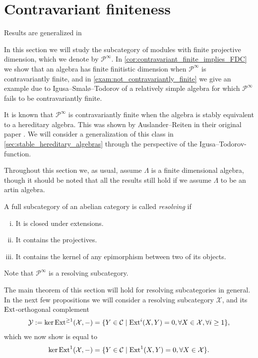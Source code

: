 \section{Contravariant finiteness}

Results are generalized in \cite{Trl01}

In this section we will study the subcategory of modules with finite projective dimension, which we denote by $\mathcal P^\infty$. In \cref{cor:contravariant_finite_implies_FDC} we show that an algebra has finite finitistic dimension when $\mathcal P^\infty$ is contravariantly finite, and in \cref{exam:not_contravariantly_finite} we give an example due to Igusa--Smalø--Todorov of a relatively simple algebra for which $\mathcal P^\infty$ fails to be contravariantly finite.

It is known that $\mathcal P^\infty$ is contravariantly finite when the algebra is stably equivalent to a hereditary algebra. This was shown by Auslander--Reiten in their original paper \cite{AR91}. We will consider a generalization of this class in \cref{sec:stable_hereditary_algebras} through the perspective of the Igusa--Todorov-function.

Throughout this section we, as usual, assume $\Lambda$ is a finite dimensional algebra, though it should be noted that all the results still hold if we assume $\Lambda$ to be an artin algebra.

\begin{defn}[Resolving]
	A full subcategory of an abelian category is called \emph{resolving} if 
	\begin{enumerate}[i)]
		\item It is closed under extensions.
		\item It contains the projectives.
		\item It contains the kernel of any epimorphism between two of its objects.
	\end{enumerate}
\end{defn}

Note that $\mathcal P^\infty$ is a resolving subcategory.

The main theorem of this section will hold for resolving subcategories in general. In the next few propositions we will consider a resolving subcategory $\mathcal X$, and its $\operatorname{Ext}$-orthogonal complement
\begin{align*}
	\mathcal Y := \ker \operatorname{Ext}^{\geq 1}(\mathcal X, -) = \{Y \in \mathcal C \mid \operatorname{Ext}^i(X, Y)=0, \forall X \in \mathcal X, \forall i \geq 1\},
\end{align*}
which we now show is equal to 
\begin{align*}
\ker \operatorname{Ext}^1(\mathcal X, -) = \{Y \in \mathcal C \mid \operatorname{Ext}^1(X, Y)=0, \forall X \in \mathcal X\}.
\end{align*}

